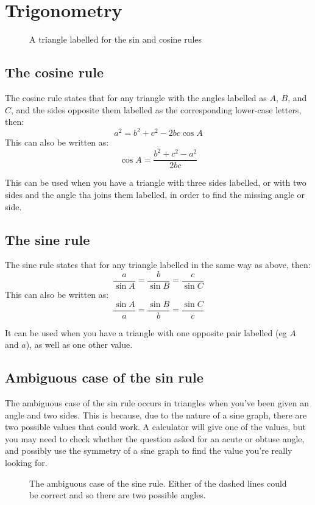 \section{Trigonometry}
\begin{figure}[ht]
    \centering
    \caption{A triangle labelled for the sin and cosine rules}
    \label{fig:a-triangle-labelled-for-the-sin-and-cosine-rules}
\end{figure}
\subsection{The cosine rule}
The cosine rule states that for any triangle with the angles labelled as $A$, $B$, and $C$, and the sides opposite them labelled as the corresponding lower-case letters, then:
\begin{equation}
	a^2=b^2+c^2-2bc\cos{A}
\end{equation}
This can also be written as:
\begin{equation}
	\cos{A}=\frac{b^2+c^2-a^2}{2bc}
\end{equation}

This can be used when you have a triangle with three sides labelled, or with two sides and the angle tha joins them labelled, in order to find the missing angle or side.

\subsection{The sine rule}
The sine rule states that for any triangle labelled in the same way as above, then:
\begin{equation}
	\frac{a}{\sin{A}}=\frac{b}{\sin{B}}=\frac{c}{\sin{C}}
\end{equation}
This can also be written as:
\begin{equation}
	\frac{\sin{A}}{a}=\frac{\sin{B}}{b}=\frac{\sin{C}}{c}
\end{equation}

It can be used when you have a triangle with one opposite pair labelled (eg $A$ and $a$), as well as one other value.

\subsection{Ambiguous case of the sin rule}
The ambiguous case of the sin rule occurs in triangles when you've been given an angle and two sides. This is because, due to the nature of a sine graph, there are two possible values that could work. A calculator will give one of the values, but you may need to check whether the question asked for an acute or obtuse angle, and possibly use the symmetry of a sine graph to find the value you're really looking for.
\begin{figure}[ht]
    \centering
    \caption{The ambiguous case of the sine rule. Either of the dashed lines could be correct and so there are two possible angles.}
    \label{fig:the-ambiguous-case-of-the-sine-rule}
\end{figure}

